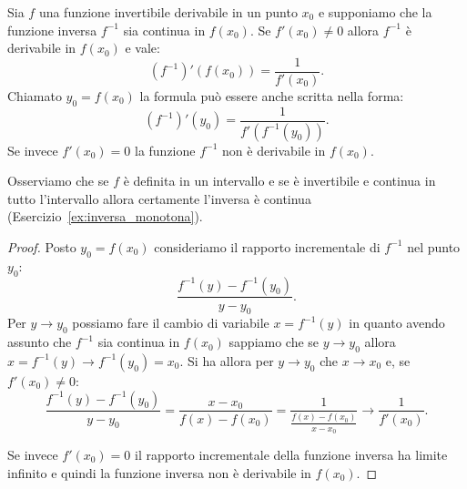 \begin{theorem}
\mymark{**}
Sia $f$ una funzione invertibile derivabile in un punto $x_0$ e
supponiamo che la funzione inversa $f^{-1}$ sia continua in $f(x_0)$.
Se $f'(x_0)\neq 0$ allora $f^{-1}$ è derivabile in $f(x_0)$ e vale:
\[
  (f^{-1})'(f(x_0)) = \frac{1}{f'(x_0)}.
\]
Chiamato $y_0 = f(x_0)$ la formula può essere anche scritta nella forma:
\[
  (f^{-1})'(y_0) = \frac{1}{f'(f^{-1}(y_0))}.
\]
Se invece $f'(x_0)=0$ la funzione $f^{-1}$ non è derivabile in $f(x_0)$.
\end{theorem}
%
Osserviamo che se $f$ è definita in un intervallo e se è invertibile e
continua in tutto l'intervallo allora certamente l'inversa è continua
(Esercizio~\ref{ex:inversa_monotona}).
%
\begin{proof}
\mymark{**}
Posto $y_0 = f(x_0)$ consideriamo il rapporto incrementale di $f^{-1}$ nel punto $y_0$:
\[
  \frac{f^{-1}(y) - f^{-1}(y_0)}{y-y_0}.
\]
Per $y\to y_0$ possiamo fare il cambio di variabile
$x=f^{-1}(y)$ in quanto avendo assunto che $f^{-1}$ sia continua in $f(x_0)$ sappiamo che se $y\to y_0$ allora $x = f^{-1}(y)\to f^{-1}(y_0) = x_0$.
Si ha allora per $y\to y_0$ che $x\to x_0$ e,
se $f'(x_0)\neq 0$:
\[
  \frac{f^{-1}(y) - f^{-1}(y_0)}{y-y_0}
  = \frac{x-x_0}{f(x)-f(x_0)}
  = \frac{1}{\frac{f(x)-f(x_0)}{x-x_0}} \to \frac{1}{f'(x_0)}.
\]

Se invece $f'(x_0)=0$ il rapporto incrementale della funzione inversa
ha limite infinito e quindi la funzione inversa non è derivabile in $f(x_0)$.
\end{proof}


